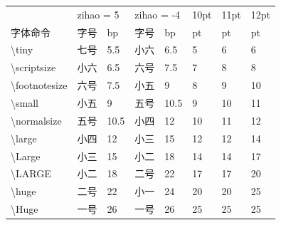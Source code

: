 \documentclass[12pt]{ctexbook}  %
\begin{document}
	\begin{table}[]
		\begin{tabular}{|l|ll|ll|l|l|l|}
			\hline
			\multicolumn{1}{|c|}{}       & \multicolumn{2}{l|}{zihao = 5} & \multicolumn{2}{l|}{zihao = -4} & 10pt & 11pt & 12pt \\ \cline{1-1}
			字体命令                         & 字号            & bp             & 字号            & bp              & pt   & pt   & pt   \\ \hline
			\textbackslash{}tiny         & 七号            & 5.5            & 小六            & 6.5             & 5    & 6    & 6    \\ \cline{1-1} \cline{6-8} 
			\textbackslash{}scriptsize   & 小六            & 6.5            & 六号            & 7.5             & 7    & 8    & 8    \\ \cline{1-1} \cline{6-8} 
			\textbackslash{}footnotesize & 六号            & 7.5            & 小五            & 9               & 8    & 9    & 10   \\ \cline{1-1} \cline{6-8} 
			\textbackslash{}small        & 小五            & 9              & 五号            & 10.5            & 9    & 10   & 11   \\ \cline{1-1} \cline{6-8} 
			\textbackslash{}normalsize   & 五号            & 10.5           & 小四            & 12              & 10   & 11   & 12   \\ \cline{1-1} \cline{6-8} 
			\textbackslash{}large        & 小四            & 12             & 小三            & 15              & 12   & 12   & 14   \\ \cline{1-1} \cline{6-8} 
			\textbackslash{}Large        & 小三            & 15             & 小二            & 18              & 14   & 14   & 17   \\ \cline{1-1} \cline{6-8} 
			\textbackslash{}LARGE        & 小二            & 18             & 二号            & 22              & 17   & 17   & 20   \\ \cline{1-1} \cline{6-8} 
			\textbackslash{}huge         & 二号            & 22             & 小一            & 24              & 20   & 20   & 25   \\ \cline{1-1} \cline{6-8} 
			\textbackslash{}Huge         & 一号            & 26             & 一号            & 26              & 25   & 25   & 25   \\ \hline
		\end{tabular}
	\end{table}
	
	\tableofcontents
	
\end{document}
